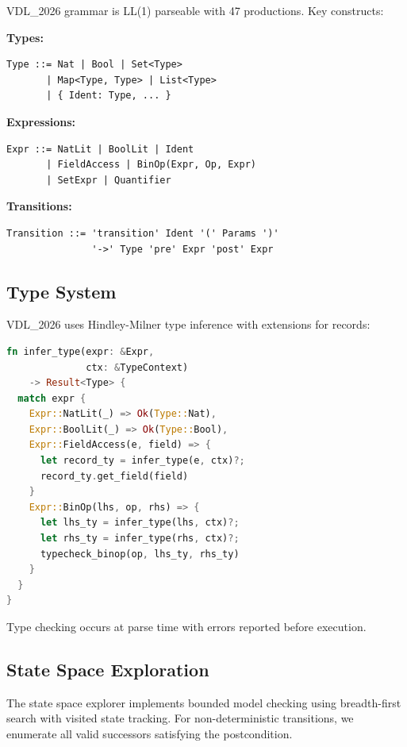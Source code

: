 \documentclass[conference]{IEEEtran}
\begin{document}
VDL\_2026 grammar is LL(1) parseable with 47 productions. Key constructs:

\textbf{Types:}
\begin{verbatim}
Type ::= Nat | Bool | Set<Type>
       | Map<Type, Type> | List<Type>
       | { Ident: Type, ... }
\end{verbatim}

\textbf{Expressions:}
\begin{verbatim}
Expr ::= NatLit | BoolLit | Ident
       | FieldAccess | BinOp(Expr, Op, Expr)
       | SetExpr | Quantifier
\end{verbatim}

\textbf{Transitions:}
\begin{verbatim}
Transition ::= 'transition' Ident '(' Params ')'
               '->' Type 'pre' Expr 'post' Expr
\end{verbatim}

\subsection{Type System}

VDL\_2026 uses Hindley-Milner type inference with extensions for records:

\begin{lstlisting}[language=Rust, caption={Type inference implementation}]
fn infer_type(expr: &Expr,
              ctx: &TypeContext)
    -> Result<Type> {
  match expr {
    Expr::NatLit(_) => Ok(Type::Nat),
    Expr::BoolLit(_) => Ok(Type::Bool),
    Expr::FieldAccess(e, field) => {
      let record_ty = infer_type(e, ctx)?;
      record_ty.get_field(field)
    }
    Expr::BinOp(lhs, op, rhs) => {
      let lhs_ty = infer_type(lhs, ctx)?;
      let rhs_ty = infer_type(rhs, ctx)?;
      typecheck_binop(op, lhs_ty, rhs_ty)
    }
  }
}
\end{lstlisting}

Type checking occurs at parse time with errors reported before execution.

\subsection{State Space Exploration}

The state space explorer implements bounded model checking using breadth-first search with visited state tracking. For non-deterministic transitions, we enumerate all valid successors satisfying the postcondition.
\end{document}
